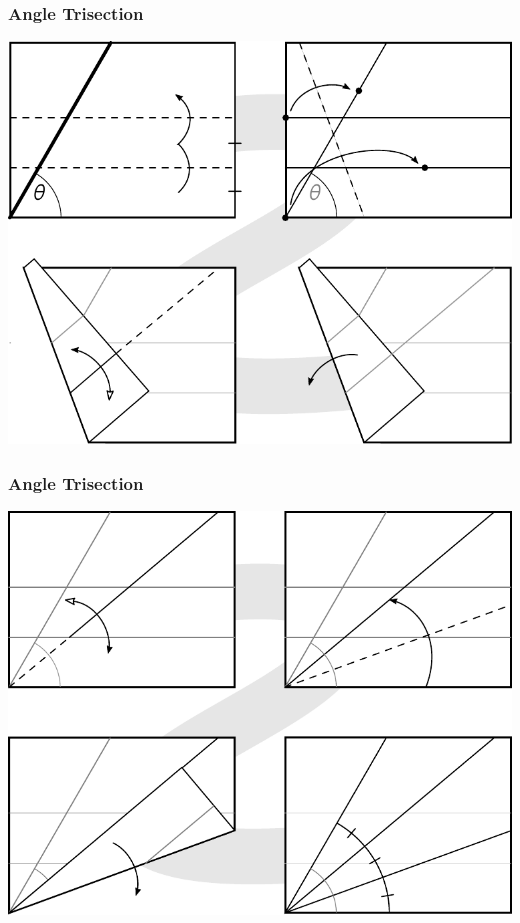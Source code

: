 \documentclass{beamer}
\begin{document}
\begin{frame}
\frametitle{Angle Trisection}
\begin{center}
\includegraphics[width=.8\textwidth]{constructions/trisection_1.pdf}
\end{center}
\end{frame}

\begin{frame}
\frametitle{Angle Trisection}
\begin{center}
\includegraphics[width=.8\textwidth]{constructions/trisection_2.pdf}
\end{center}
\end{frame}
\end{document}
